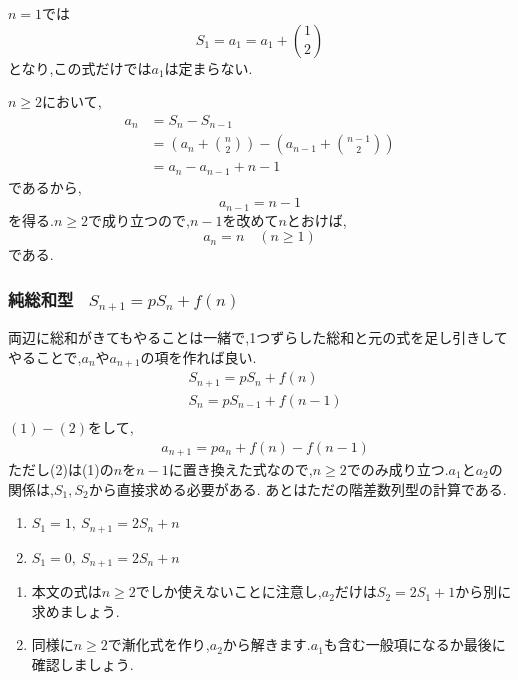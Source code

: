 \begin{enumerate}[label=(\arabic*),parsep=3pt,format=\bookitemlink{example-summation-1}{solution}{problem}]
        $n=1$では
        \[
          S_1=a_1=a_1+\binom12
        \]
        となり,この式だけでは$a_1$は定まらない.

        $n\ge2$において,
        \begin{align*}
          a_n
            &=S_n-S_{n-1}\\
            &=\left(a_n+\binom n2\right)
              -\left(a_{n-1}+\binom{n-1}{2}\right)\\
            &=a_n-a_{n-1}+n-1
        \end{align*}
        であるから,
        \[
          a_{n-1}=n-1
        \]
        を得る.$n\ge2$で成り立つので,$n-1$を改めて$n$とおけば,
        \[
          a_n=n\quad(n\ge1)
        \]
        である.

    \end{enumerate}

  \subsubsection{\texorpdfstring{純総和型 \, $S_{n+1}=pS_n+f(n) $}{純総和型}}
    両辺に総和がきてもやることは一緒で,1つずらした総和と元の式を足し引きしてやることで,$a_n$や$a_{n+1}$の項を作れば良い.
    \begin{align*}
      &S_{n+1}=pS_n+f(n) \tag*{\(\cdots\) (1)}\\
      &S_{n}=pS_{n-1}+f(n-1) \tag*{\(\cdots\) (2)}\\
    \end{align*}
      $(1)-(2)$をして,
    \begin{align*}
      &a_{n+1}=pa_{n}+f(n)-f(n-1)
    \end{align*}
    ただし(2)は(1)の$n$を$n-1$に置き換えた式なので,$n\ge2$でのみ成り立つ.$a_1$と$a_2$の関係は,$S_1,S_2$から直接求める必要がある.
    あとはただの階差数列型の計算である.

    \noindent {}
    \begin{enumerate}[label=(\arabic*),parsep=3pt,format=\bookitemlink{example-summation-2}{problem}{answer}]
      \item $\displaystyle S_1=1,\ S_{n+1}=2S_n+n$
      \item $\displaystyle S_1=0,\ S_{n+1}=2S_n+n$
    \end{enumerate}

    \noindent{}
    \begin{enumerate}[label=(\arabic*),parsep=3pt,format=\bookitemlink{example-summation-2}{hint}{problem}]
      \item 本文の式は$n\ge2$でしか使えないことに注意し,$a_2$だけは$S_2=2S_1+1$から別に求めましょう.
      \item 同様に$n\ge2$で漸化式を作り,$a_2$から解きます.$a_1$も含む一般項になるか最後に確認しましょう.
    \end{enumerate}

